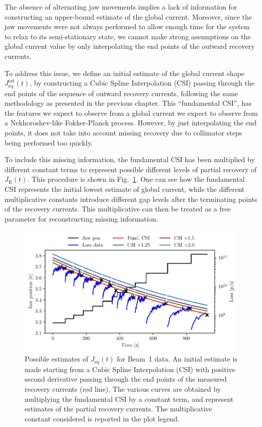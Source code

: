 The absence of alternating jaw movements implies a lack of information for constructing an upper-bound estimate of the global current. Moreover, since the jaw movements were not always performed to allow enough time for the system to relax to its semi-stationary state, we cannot make strong assumptions on the global current value by only interpolating the end points of the outward recovery currents. 

To address this issue, we define an initial estimate of the global current shape $J_\text{eq}^{\text{est}}(t)$, by constructing a Cubic Spline Interpolation (CSI) passing through the end points of the sequence of outward recovery currents, following the same methodology as presented in the previous chapter. This ``fundamental CSI'', has the features we expect to observe from a global current we expect to observe from a Nekhoroshev-like Fokker-Planck process. However, by just interpolating the end points, it does not take into account missing recovery due to collimator steps being performed too quickly.

To include this missing information, the fundamental CSI has been multiplied by different constant terms to represent possible different levels of partial recovery of $J_\mathrm{R}(t)$. This procedure is shown in Fig.~\ref{fig:second}. One can see how the fundamental CSI represents the initial lowest estimate of global current, while the different multiplicative constants introduce different gap levels after the terminating points of the recovery currents. This multiplicative can then be treated as a free parameter for reconstructing missing information.

%
\begin{figure}[thp]
    \centering
    \includegraphics[trim={0 2.5mm 0 3mm}, clip, width=\columnwidth]{5_Diffusion_measurement_LHC/figs/second_bis.pdf}
    \caption{Possible estimates of $J_\mathrm{eq}(t)$ for Beam~1 data. An initial estimate is made starting from a Cubic Spline Interpolation (CSI) with positive second derivative passing through the end points of the measured recovery currents (red line). The various curves are obtained by multiplying the fundamental CSI by a constant term, and represent estimates of the partial recovery currents. The multiplicative constant considered is reported in the plot legend.}
    \label{fig:second}
\end{figure}
%

